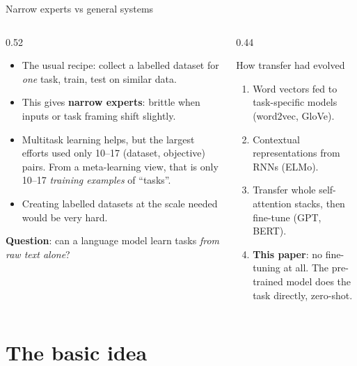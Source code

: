 \documentclass[aspectratio=169,11pt]{beamer}
\begin{document}
\begin{frame}{Narrow experts vs general systems}
  \begin{columns}[T]
    \begin{column}{0.52\textwidth}
      \small
      \begin{itemize}
        \item The usual recipe: collect a labelled dataset for \emph{one} task, train, test on similar data.
        \item This gives \textbf{narrow experts}: brittle when inputs or task framing shift slightly.
        \item Multitask learning helps, but the largest efforts used only 10--17 (dataset, objective) pairs. From a meta-learning view, that is only 10--17 \emph{training examples} of ``tasks''.
        \item Creating labelled datasets at the scale needed would be very hard.
      \end{itemize}
      \vspace{1mm}
      \textbf{Question}: can a language model learn tasks \emph{from raw text alone}?
    \end{column}
    \begin{column}{0.44\textwidth}
      \begin{block}{How transfer had evolved}
        \small
        \begin{enumerate}
          \item Word vectors fed to task-specific models (word2vec, GloVe).
          \item Contextual representations from RNNs (ELMo).
          \item Transfer whole self-attention stacks, then fine-tune (GPT, BERT).
          \item \textbf{This paper}: no fine-tuning at all. The pre-trained model does the task directly, zero-shot.
        \end{enumerate}
      \end{block}
    \end{column}
  \end{columns}
\end{frame}

\section{The basic idea}
\end{document}
